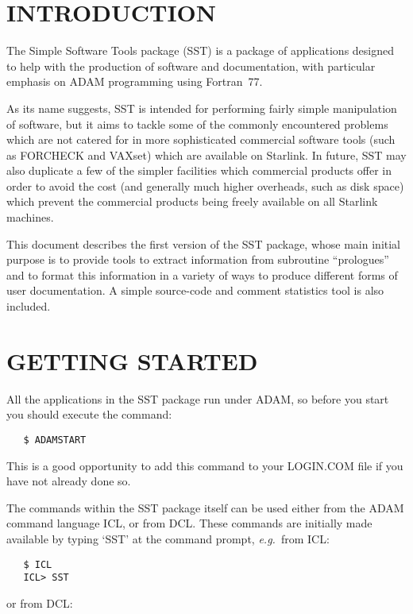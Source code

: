 \section{INTRODUCTION}

The Simple Software Tools package (SST) is a package of applications
designed to help with the production of software and documentation, with
particular emphasis on ADAM programming using Fortran~77.

As its name suggests, SST is intended for performing fairly simple
manipulation of software, but it aims to tackle some of the
commonly encountered problems which are not catered for in more
sophisticated commercial software tools (such as FORCHECK and VAXset) which
are available on Starlink.
In future, SST may also duplicate a few of the simpler facilities which
commercial products offer in order to avoid the cost (and generally much
higher overheads, such as disk space) which prevent the commercial products
being freely available on all Starlink machines.

This document describes the first version of the SST package, whose main
initial purpose is to provide tools to extract information from subroutine
``prologues'' and to format this information in a variety of ways to produce
different forms of user documentation.
A simple source-code and comment statistics tool is also included.


\section{GETTING STARTED}

All the applications in the SST package run under ADAM, so before you start
you should execute the command:

\begin{verbatim}
   $ ADAMSTART
\end{verbatim}

This is a good opportunity to add this command to your LOGIN.COM file if you
have not already done so.

The commands within the SST package itself can be used either from the ADAM
command language ICL, or from DCL.
These commands are initially made available by typing `SST' at the command
prompt, {\em e.g.}\ from ICL:

\begin{verbatim}
   $ ICL
   ICL> SST
\end{verbatim}

or from DCL:

